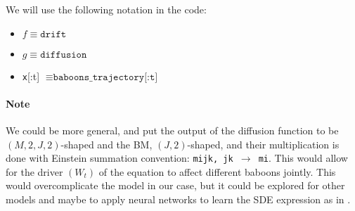 \documentclass[
    article,
    oneside,
]{memoir}
\begin{document}
We will use the following notation in the code:
\begin{itemize}
    \item $f \equiv \texttt{drift}$
    \item $g \equiv \texttt{diffusion}$
    \item \texttt{x}[:t] $\equiv \texttt{baboons\_trajectory[:t]}$
\end{itemize}

\paragraph{Note} We could be more general, and put the output of the diffusion function to be
$(M, 2, J, 2)$-shaped and the BM, $(J, 2)$-shaped, and their multiplication is done
with Einstein summation convention: \texttt{mijk, jk $\rightarrow$ mi}. This would allow for the driver \((W_t)\) of the equation to affect different baboons jointly. This would overcomplicate the model in our case, but it could be explored for other models and maybe to apply neural networks to learn the SDE expression as in \cite{chen2019neuralordinarydifferentialequations, kidger2021neuralsdesinfinitedimensionalgans}.

\printbibliography
\end{document}
